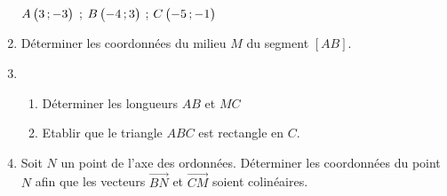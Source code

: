 \documentclass{book}
\begin{document}
\begin{multicols*}{2}
\begin{enumerate}
\hglue\leftmarginii$A\coord{3}{{-}3}$%
\quad\string;\quad%
$B\coord{-4}{3}$%
\quad\string;\quad%
$C\coord{-5}{{-}1}$

\item D\'eterminer les coordonn\'ees du milieu  $M$ du segment $[AB]$.

\item \begin{enumerate}
\item D\'eterminer les longueurs $AB$ et $MC$

\item Etablir que le triangle $ABC$ est rectangle en $C$.
\end{enumerate}

\item Soit $N$ un point de l'axe des ordonn\'ees. D\'eterminer les coordonn\'ees du point $N$ afin que les vecteurs $\Vec{BN}$ et $\Vec{CM}$ soient colin\'eaires.
\end{enumerate}

\end{multicols*}
\end{document}
